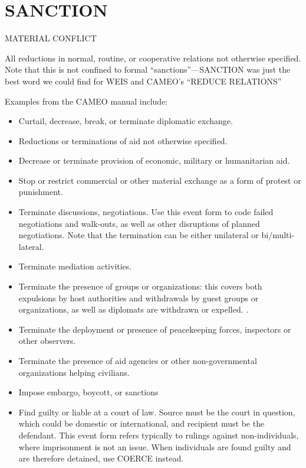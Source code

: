 \documentclass[11pt]{report}
\newcommand{\plcat}[1]{\textsf{#1}}
\begin{document}
\newpage  


\section{SANCTION}

\textsf{MATERIAL CONFLICT} \vspace{8pt}

All reductions in normal, routine, or cooperative relations not otherwise specified. Note that this is not confined to formal ``sanctions''---\plcat{SANCTION} was just the best word we could find for WEIS and CAMEO's ``REDUCE RELATIONS''

Examples from the CAMEO manual include:

\begin{itemize}
\item Curtail, decrease, break, or terminate diplomatic exchange.
\item Reductions or terminations of aid not otherwise specified.
\item Decrease or terminate provision of economic, military or humanitarian aid.
\item Stop or restrict commercial or other material exchange as a form of protest or punishment.
\item Terminate discussions, negotiations. Use this event form to code failed negotiations and walk-outs, as well as other disruptions of planned negotiations. Note that the termination can be either unilateral or bi/multi-lateral.
\item Terminate mediation activities.
\item Terminate the presence of groups or organizations: this covers both expulsions by host authorities and withdrawals by guest groups or organizations, as well as diplomats are withdrawn or expelled. .   \item Terminate the deployment or presence of peacekeeping forces, inspectors or other observers.
\item Terminate the presence of aid agencies or other non-governmental organizations helping civilians.
\item  Impose embargo, boycott, or sanctions
\item  Find guilty or liable at a court of law. Source must be the court in question, which could be domestic or international, and recipient must be the defendant. This event form refers typically to rulings against non-individuals, where imprisonment is not an issue. When individuals are found guilty and are therefore detained, use \plcat{COERCE} instead.
\end{itemize}
\end{document}

